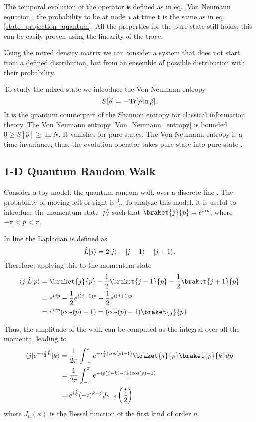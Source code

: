 The temporal evolution of the operator is defined as in eq. \eqref{Von Neumann equation}; the probability to be at node a at time t is the same as in eq. \eqref{state_projection_quantum}. All the properties for the pure state still holds; this can be easily proven using the linearity of the trace.

Using the mixed density matrix we can consider a system that does not start from a defined distribution, but from an ensemble of possible distribution with their probability. 

To study the mixed state we introduce the Von Neumann entropy
\begin{equation}\label{Von_Neumann_entropy}
    S[\hat\rho]=-\operatorname{Tr}[\hat\rho\ln\hat\rho].
\end{equation}
It is the quantum counterpart of the Shannon entropy for classical information theory.
The Von Neumann entropy \eqref{Von_Neumann_entropy} is bounded $0\geq S[\hat\rho] \geq \ln N$. It vanishes for pure states.
The Von Neumann entropy is a time invariance, thus, the evolution operator takes pure state into pure state \cite{Nielsen_Chuang_2010}.


\subsection{1-D Quantum Random Walk}
Consider a toy model: the quantum random walk over a discrete line \cite{Farhi_98}. The probability of moving left or right is $\frac{1}{2}$.
To analyze this model, it is useful to introduce the momentum state $\lvert p\rangle$ such that $\braket{j}{p} = e^{ijp}$, where $-\pi < p< \pi$.

In line the Laplacian is defined as
\begin{equation}
    \hat L \lvert j\rangle = 2\lvert j\rangle -\lvert j-1\rangle -\lvert j+1\rangle . 
\end{equation}
Therefore, applying this to the momentum state
\begin{equation}
    \begin{split}
        \bra{j}\hat L \ket{p} &= \braket{j}{p} -\frac{1}{2}\braket{j-1}{p} -\frac{1}2{}\braket{j+1}{p}\\
        &= e^{ijp} -\frac{1}{2}e^{i(j-1)p} - \frac{1}{2}e^{i(j+1)p}\\
        &= e^{ijp}(\cos(p) - 1) = (\cos(p) - 1)\braket{j}{p}
    \end{split}
\end{equation}

Thus, the amplitude of the walk can be computed as the integral over all the momenta, leading to
\begin{equation}
    \begin{split}
        \bra{j}e^{-i\frac{t}{2}\hat L} \ket{k}&= \frac{1}{2\pi}\int_{-\pi}^{\pi} e^{-i\frac{t}{2}(\cos(p) - 1)} \braket{j}{p} \braket{p}{k} dp\\
        &= \frac{1}{2\pi}\int_{-\pi}^{\pi} e^{-ip(j-k)-i\frac{t}{2}(\cos(p) - 1)}\\
        & = e^{i\frac{t}{2}}(-i)^{k-j}J_{k-j}\left(\frac{t}{2}\right),
   \end{split}
\end{equation}
where $J_{n}(x)$ is the Bessel function of the first kind of order $n$.

